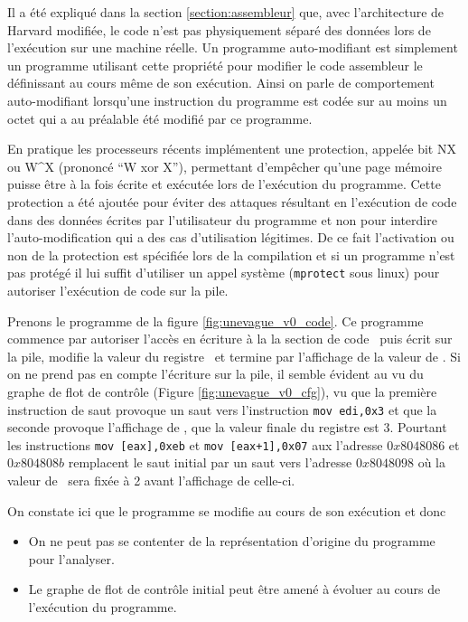 Il a été expliqué dans la section \ref{section:assembleur} que, avec l'architecture de Harvard modifiée, le code n'est pas physiquement séparé des données lors de l'exécution sur une machine réelle.
Un programme auto-modifiant est simplement un programme utilisant cette propriété pour modifier le code assembleur le définissant au cours même de son exécution.
Ainsi on parle de comportement auto-modifiant lorsqu'une instruction du programme est codée sur au moins un octet qui a au préalable été modifié par ce programme.

En pratique les processeurs récents implémentent une protection, appelée bit NX ou W\textasciicircum X (prononcé ``W xor X''), permettant d'empêcher qu'une page mémoire puisse être à la fois écrite et exécutée lors de l'exécution du programme.
Cette protection a été ajoutée pour éviter des attaques résultant en l'exécution de code dans des données écrites par l'utilisateur du programme et non pour interdire l'auto-modification qui a des cas d'utilisation légitimes.
De ce fait l'activation ou non de la protection est spécifiée lors de la compilation et si un programme n'est pas protégé il lui suffit d'utiliser un appel système (\texttt{mprotect} sous linux) pour autoriser l'exécution de code sur la pile.

Prenons le programme de la figure \ref{fig:unevague_v0_code}. Ce programme commence par autoriser l'accès en écriture à la la section de code \ptext\ puis écrit sur la pile, modifie la valeur du registre \edi\ et termine par l'affichage de la valeur de \edi.
Si on ne prend pas en compte l'écriture sur la pile, il semble évident au vu du graphe de flot de contrôle (Figure \ref{fig:unevague_v0_cfg}), vu que la première instruction de saut provoque un saut vers l'instruction \texttt{mov edi,0x3} et que la seconde provoque l'affichage de \edi, que la valeur finale du registre est 3.
Pourtant les instructions \texttt{mov [eax],0xeb} et \texttt{mov [eax+1],0x07} aux l'adresse $0x8048086$ et $0x804808b$ remplacent le saut initial par un saut vers l'adresse $0x8048098$ où la valeur de \edi\ sera fixée à 2 avant l'affichage de celle-ci.


On constate ici que le programme se modifie au cours de son exécution et donc
\begin{itemize}
 \item On ne peut pas se contenter de la représentation d'origine du programme pour l'analyser.
 \item Le graphe de flot de contrôle initial peut être amené à évoluer au cours de l'exécution du programme.
\end{itemize}

